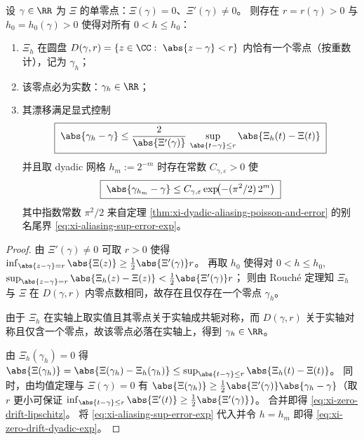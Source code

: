 \begin{theorem}[单零点的唯一跟踪与二进制分辨率指数收敛]\label{thm:xi-dyadic-zero-tracking}
设 \(\gamma\in\RR\) 为 \(\Xi\) 的单零点：\(\Xi(\gamma)=0\)、\(\Xi'(\gamma)\neq 0\)。
则存在 \(r=r(\gamma)>0\) 与 \(h_0=h_0(\gamma)>0\) 使得对所有 \(0<h\le h_0\)：
\begin{enumerate}
  \item \(\Xi_h\) 在圆盘 \(D(\gamma,r)=\{z\in\CC:\ \abs{z-\gamma}<r\}\) 内恰有一个零点（按重数计），记为 \(\gamma_h\)；
  \item 该零点必为实数：\(\gamma_h\in\RR\)；
  \item 其漂移满足显式控制
  \begin{equation}\label{eq:xi-zero-drift-lipschitz}
  \boxed{\;
  \abs{\gamma_h-\gamma}
  \le
  \frac{2}{\abs{\Xi'(\gamma)}}\,
  \sup_{\abs{t-\gamma}\le r}\abs{\Xi_h(t)-\Xi(t)}\;}
  \end{equation}
  并且取 dyadic 网格 \(h_m:=2^{-m}\) 时存在常数 \(C_{\gamma,\varepsilon}>0\) 使
  \begin{equation}\label{eq:xi-zero-drift-dyadic-exp}
  \boxed{\;
  \abs{\gamma_{h_m}-\gamma}
  \le
  C_{\gamma,\varepsilon}\exp\!\bigl(-(\pi^2/2)\,2^{m}\bigr)\;}
  \end{equation}
  其中指数常数 \(\pi^2/2\) 来自定理 \ref{thm:xi-dyadic-aliasing-poisson-and-error} 的别名尾界 \eqref{eq:xi-aliasing-sup-error-exp}。
\end{enumerate}
\end{theorem}
\begin{proof}
由 \(\Xi'(\gamma)\neq 0\) 可取 \(r>0\) 使得
\(
\inf_{\abs{z-\gamma}=r}\abs{\Xi(z)}\ge \frac12\abs{\Xi'(\gamma)}r
\)。
再取 \(h_0\) 使得对 \(0<h\le h_0\),
\(
\sup_{\abs{z-\gamma}=r}\abs{\Xi_h(z)-\Xi(z)}<\frac12\abs{\Xi'(\gamma)}r
\)；
则由 Rouch\'e 定理知 \(\Xi_h\) 与 \(\Xi\) 在 \(D(\gamma,r)\) 内零点数相同，故存在且仅存在一个零点 \(\gamma_h\)。
\par
由于 \(\Xi_h\) 在实轴上取实值且其零点关于实轴成共轭对称，而 \(D(\gamma,r)\) 关于实轴对称且仅含一个零点，故该零点必落在实轴上，得到 \(\gamma_h\in\RR\)。
\par
由 \(\Xi_h(\gamma_h)=0\) 得 \(\abs{\Xi(\gamma_h)}=\abs{\Xi(\gamma_h)-\Xi_h(\gamma_h)}\le \sup_{\abs{t-\gamma}\le r}\abs{\Xi_h(t)-\Xi(t)}\)。
同时，由均值定理与 \(\Xi(\gamma)=0\) 有 \(\abs{\Xi(\gamma_h)}\ge \frac12\abs{\Xi'(\gamma)}\abs{\gamma_h-\gamma}\)（取 \(r\) 更小可保证 \(\inf_{\abs{t-\gamma}\le r}\abs{\Xi'(t)}\ge \frac12\abs{\Xi'(\gamma)}\)）。
合并即得 \eqref{eq:xi-zero-drift-lipschitz}。
将 \eqref{eq:xi-aliasing-sup-error-exp} 代入并令 \(h=h_m\) 即得 \eqref{eq:xi-zero-drift-dyadic-exp}。
\end{proof}

